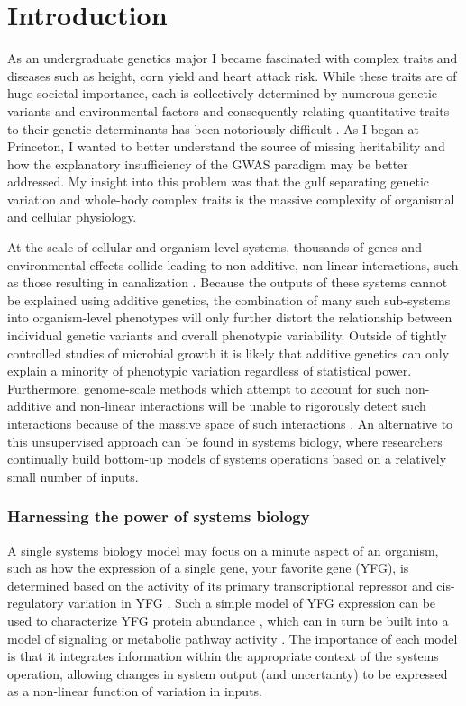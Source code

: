 
\chapter{Introduction\label{ch:intro}}

As an undergraduate genetics major I became fascinated with complex traits and diseases such as height, corn yield and heart attack risk. While these traits are of huge societal importance, each is collectively determined by numerous genetic variants and environmental factors and consequently relating quantitative traits to their genetic determinants has been notoriously difficult \cite{Manolio:2009jp}. As I began at Princeton, I wanted to better understand the source of missing heritability and how the explanatory insufficiency of the GWAS paradigm may be better addressed. My insight into this problem was that the gulf separating genetic variation and whole-body complex traits is the massive complexity of organismal and cellular physiology.

At the scale of cellular and organism-level systems, thousands of genes and environmental effects collide leading to non-additive, non-linear interactions, such as those resulting in canalization \cite{Waddington:1942wy}. Because the outputs of these systems cannot be explained using additive genetics, the combination of many such sub-systems into organism-level phenotypes will only further distort the relationship between individual genetic variants and overall phenotypic variability. 
Outside of tightly controlled studies of microbial growth \cite{Bloom:2013bq} it is likely that additive genetics can only explain a minority of phenotypic variation regardless of statistical power. Furthermore, genome-scale methods which attempt to account for such non-additive and non-linear interactions will be unable to rigorously detect such interactions because of the massive space of such interactions \cite{Friedman:1997kn}. An alternative to this unsupervised approach can be found in systems biology, where researchers continually build bottom-up models of systems operations based on a relatively small number of inputs.

\subsection{Harnessing the power of systems biology}

A single systems biology model may focus on a minute aspect of an organism, such as how the expression of a single gene, your favorite gene (YFG), is determined based on the activity of its primary transcriptional repressor and cis-regulatory variation in YFG \cite{Nuzhdin:2012ii}. Such a simple model of YFG expression can be used to characterize YFG protein abundance \cite{Jovanovic:2015hp}, which can in turn be built into a model of signaling or metabolic pathway activity \cite{Neves:2002bk, Chassagnole:2002ty}.  The importance of each model is that it integrates information within the appropriate context of the systems operation, allowing changes in system output (and uncertainty) to be expressed as a non-linear function of variation in inputs.

